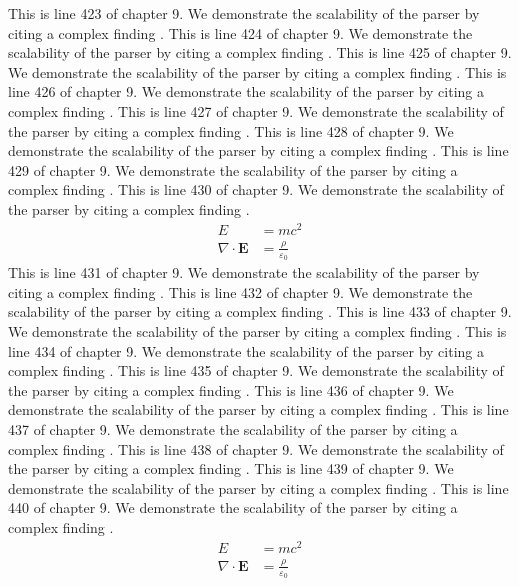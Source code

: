 This is line 423 of chapter 9. We demonstrate the scalability of the parser by citing a complex finding \cite{ref9_423}.
This is line 424 of chapter 9. We demonstrate the scalability of the parser by citing a complex finding \cite{ref9_424}.
This is line 425 of chapter 9. We demonstrate the scalability of the parser by citing a complex finding \cite{ref9_425}.
This is line 426 of chapter 9. We demonstrate the scalability of the parser by citing a complex finding \cite{ref9_426}.
This is line 427 of chapter 9. We demonstrate the scalability of the parser by citing a complex finding \cite{ref9_427}.
This is line 428 of chapter 9. We demonstrate the scalability of the parser by citing a complex finding \cite{ref9_428}.
This is line 429 of chapter 9. We demonstrate the scalability of the parser by citing a complex finding \cite{ref9_429}.
This is line 430 of chapter 9. We demonstrate the scalability of the parser by citing a complex finding \cite{ref9_430}.
\begin{align*}
  E &= mc^2 \\
  \nabla \cdot \mathbf{E} &= \frac{\rho}{\varepsilon_0}
\end{align*}
This is line 431 of chapter 9. We demonstrate the scalability of the parser by citing a complex finding \cite{ref9_431}.
This is line 432 of chapter 9. We demonstrate the scalability of the parser by citing a complex finding \cite{ref9_432}.
This is line 433 of chapter 9. We demonstrate the scalability of the parser by citing a complex finding \cite{ref9_433}.
This is line 434 of chapter 9. We demonstrate the scalability of the parser by citing a complex finding \cite{ref9_434}.
This is line 435 of chapter 9. We demonstrate the scalability of the parser by citing a complex finding \cite{ref9_435}.
This is line 436 of chapter 9. We demonstrate the scalability of the parser by citing a complex finding \cite{ref9_436}.
This is line 437 of chapter 9. We demonstrate the scalability of the parser by citing a complex finding \cite{ref9_437}.
This is line 438 of chapter 9. We demonstrate the scalability of the parser by citing a complex finding \cite{ref9_438}.
This is line 439 of chapter 9. We demonstrate the scalability of the parser by citing a complex finding \cite{ref9_439}.
This is line 440 of chapter 9. We demonstrate the scalability of the parser by citing a complex finding \cite{ref9_440}.
\begin{align*}
  E &= mc^2 \\
  \nabla \cdot \mathbf{E} &= \frac{\rho}{\varepsilon_0}
\end{align*}

